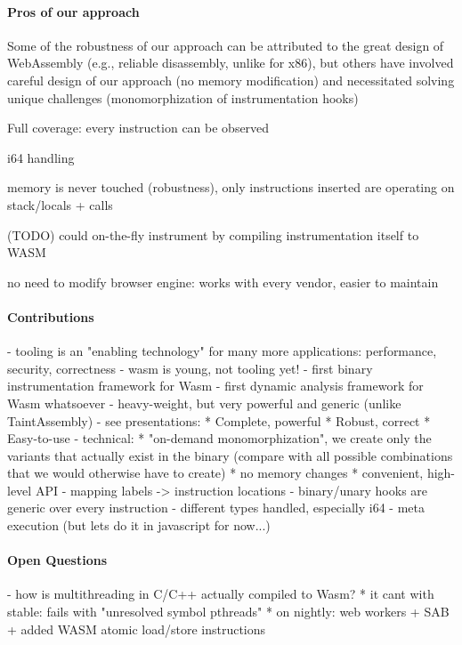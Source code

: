 \documentclass[sigplan,review,anonymous]{acmart}\settopmatter{printfolios=true,printccs=false,printacmref=false}
\begin{document}
\paragraph{Pros of our approach}
Some of the robustness of our approach can be attributed to the great design of WebAssembly (e.g., reliable disassembly, unlike for x86), but others have involved careful design of our approach (no memory modification) and necessitated solving unique challenges (monomorphization of instrumentation hooks)

Full coverage: every instruction can be observed

i64 handling

memory is never touched (\textrightarrow robustness), only instructions inserted are operating on stack/locals + calls

(TODO) could on-the-fly instrument by compiling instrumentation itself to WASM

no need to modify browser engine: works with every vendor, easier to maintain

\paragraph{Contributions}

- tooling is an "enabling technology" for many more applications: performance, security, correctness
- wasm is young, not tooling yet!
- first binary instrumentation framework for Wasm
- first dynamic analysis framework for Wasm whatsoever
- heavy-weight, but very powerful and generic (unlike TaintAssembly)
- see presentations:
	* Complete, powerful
	* Robust, correct
	* Easy-to-use
- technical: 
	* "on-demand monomorphization", we create only the variants that actually exist in the binary (compare with all possible combinations that we would otherwise have to create)
	* no memory changes
	* convenient, high-level API
		- mapping labels -> instruction locations
		- binary/unary hooks are generic over every instruction
		- different types handled, especially i64
- meta execution (but lets do it in javascript for now...)
		
\paragraph{Open Questions}
- how is multithreading in C/C++ actually compiled to Wasm?
	* it cant with stable: fails with "unresolved symbol pthreads"
	* on nightly: web workers + SAB + added WASM atomic load/store instructions
\end{document}
